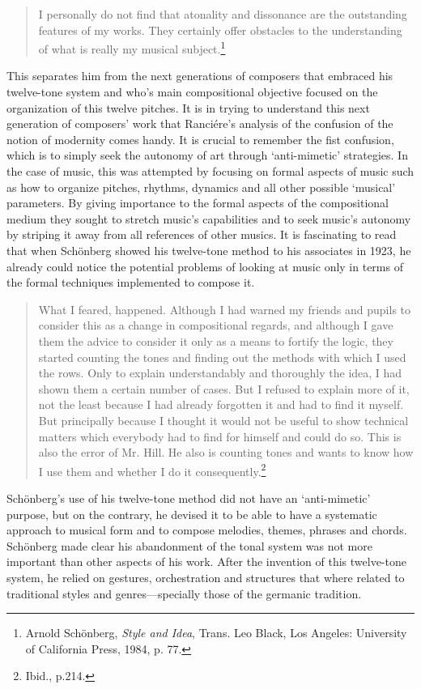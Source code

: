 \begin{quote}
I personally do not find that atonality and dissonance are the outstanding features of my works. They certainly offer obstacles to the understanding of what is really my musical subject.\footnote{Arnold Sch\"{o}nberg, \emph{Style and Idea}, Trans. Leo Black, Los Angeles: University of California Press, 1984, p. 77.}
\end{quote}
This separates him from the next generations of composers that embraced his twelve-tone system and who's main compositional objective focused on the organization of this twelve pitches. It is in trying to understand this next generation of composers' work that Ranci\'{e}re's analysis of the confusion of the notion of modernity comes handy. It is crucial to remember the fist confusion, which is to simply seek the autonomy of art through `anti-mimetic' strategies. In the case of music, this was attempted by focusing on formal aspects of music such as how to organize pitches, rhythms, dynamics and all other possible `musical' parameters. By giving importance to the formal aspects of the compositional medium they sought to stretch music's capabilities and to seek music's autonomy by striping it away from all references of other musics. It is fascinating to read that when Sch\"{o}nberg showed his twelve-tone method to his associates in 1923, he already could notice the potential problems of looking at music only in terms of the formal techniques implemented to compose it. 
\begin{quote}
What I feared, happened. Although I had warned my friends and pupils to consider this as a change in compositional regards, and although I gave them the advice to consider it only as a means to fortify the logic, they started counting the tones and finding out the methods with which I used the rows. Only to explain understandably and thoroughly the idea, I had shown them a certain number of cases. But I refused to explain more of it, not the least because I had already forgotten it and had to find it myself. But principally because I thought it would not be useful to show technical matters which everybody had to find for himself and could do so. This is also the error of Mr. Hill. He also is counting tones and wants to know how I use them and whether I do it consequently.\footnote{Ibid., p.214.} 
\end{quote}
Sch\"{o}nberg's use of his twelve-tone method did not have an `anti-mimetic' purpose, but on the contrary, he devised it to be able to have a systematic approach to musical form and to compose melodies, themes, phrases and chords. Sch\"{o}nberg made clear his abandonment of the tonal system was not more important than other aspects of his work. After the invention of this twelve-tone system, he relied on gestures, orchestration and structures that where related to traditional styles and genres---specially those of the germanic tradition. 









